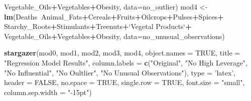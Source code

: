 \documentclass[
]{article}
\newenvironment{Shaded}{\begin{snugshade}}{\end{snugshade}}
\newcommand{\DataTypeTok}[1]{\textcolor[rgb]{0.13,0.29,0.53}{#1}}
\newcommand{\KeywordTok}[1]{\textcolor[rgb]{0.13,0.29,0.53}{\textbf{#1}}}
\newcommand{\NormalTok}[1]{#1}
\newcommand{\OperatorTok}[1]{\textcolor[rgb]{0.81,0.36,0.00}{\textbf{#1}}}
\newcommand{\OtherTok}[1]{\textcolor[rgb]{0.56,0.35,0.01}{#1}}
\newcommand{\StringTok}[1]{\textcolor[rgb]{0.31,0.60,0.02}{#1}}
\begin{document}
\begin{Shaded}
\begin{Highlighting}[]
\StringTok{             }\NormalTok{Vegetable_Oils}\OperatorTok{+}\NormalTok{Vegetables}\OperatorTok{+}\NormalTok{Obesity, }\DataTypeTok{data=}\NormalTok{no_outlier)}
\NormalTok{mod4 <-}\StringTok{ }\KeywordTok{lm}\NormalTok{(Deaths}\OperatorTok{~}\NormalTok{Animal_Fats}\OperatorTok{+}\NormalTok{Cereals}\OperatorTok{+}\NormalTok{Fruits}\OperatorTok{+}\NormalTok{Oilcrops}\OperatorTok{+}\NormalTok{Pulses}\OperatorTok{+}\NormalTok{Spices}\OperatorTok{+}
\StringTok{             }\NormalTok{Starchy_Roots}\OperatorTok{+}\NormalTok{Stimulants}\OperatorTok{+}\NormalTok{Treenuts}\OperatorTok{+}\StringTok{`}\DataTypeTok{Vegetal Products}\StringTok{`}\OperatorTok{+}
\StringTok{             }\NormalTok{Vegetable_Oils}\OperatorTok{+}\NormalTok{Vegetables}\OperatorTok{+}\NormalTok{Obesity, }\DataTypeTok{data=}\NormalTok{no_unusual_observations)}

\KeywordTok{stargazer}\NormalTok{(mod0, mod1, mod2, mod3, mod4, }\DataTypeTok{object.names =} \OtherTok{TRUE}\NormalTok{, }
          \DataTypeTok{title =} \StringTok{"Regression Model Results"}\NormalTok{, }\DataTypeTok{column.labels =} 
            \KeywordTok{c}\NormalTok{(}\StringTok{"Original"}\NormalTok{, }\StringTok{"No High Leverage"}\NormalTok{, }\StringTok{"No Influential"}\NormalTok{, }
              \StringTok{"No Oultlier"}\NormalTok{, }\StringTok{"No Unusual Observations"}\NormalTok{), }\DataTypeTok{type =} \StringTok{'latex'}\NormalTok{, }
          \DataTypeTok{header =} \OtherTok{FALSE}\NormalTok{, }\DataTypeTok{no.space =} \OtherTok{TRUE}\NormalTok{, }\DataTypeTok{single.row =} \OtherTok{TRUE}\NormalTok{, }
          \DataTypeTok{font.size =} \StringTok{"small"}\NormalTok{, }\DataTypeTok{column.sep.width =} \StringTok{"-15pt"}\NormalTok{)}
\end{Highlighting}
\end{Shaded}
\end{document}
